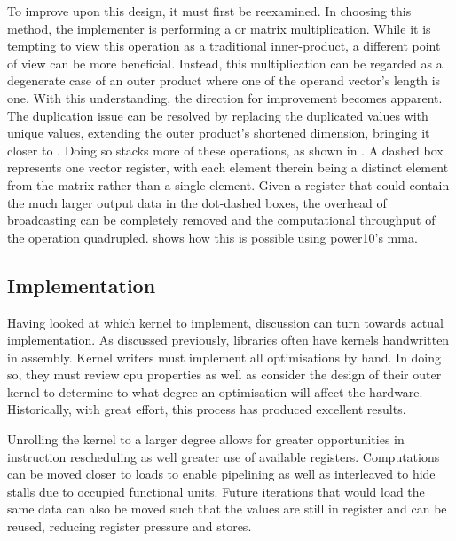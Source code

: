 \documentclass[\main/thesis.tex]{subfiles}
\begin{document}
To improve upon this design, it must first be reexamined.
In choosing this method, the implementer is performing a  or  matrix multiplication.
While it is tempting to view this operation as a traditional inner-product, a different point of view can be more beneficial.
Instead, this multiplication can be regarded as a degenerate case of an outer product where one of the operand vector's length is one.
With this understanding, the direction for improvement becomes apparent.
The duplication issue can be resolved by replacing the duplicated values with unique values, extending the outer product's shortened dimension, bringing it closer to .
Doing so stacks more of these operations, as shown in .
A dashed box represents one vector register, with each element therein being a distinct element from the matrix rather than a single  element.
Given a register that could contain the much larger output data in the dot-dashed boxes, the overhead of broadcasting can be completely removed and the computational throughput of the operation quadrupled.
 shows how this is possible using \gls{power10}'s \gls{mma}.

\subsection{Implementation}
Having looked at which kernel to implement, discussion can turn towards actual implementation.
As discussed previously, libraries often have kernels handwritten in assembly.
Kernel writers must implement all optimisations by hand.
In doing so, they must review \gls{cpu} properties as well as consider the design of their outer kernel to determine to what degree an optimisation will affect the hardware.
Historically, with great effort, this process has produced excellent results.

Unrolling the kernel to a larger degree allows for greater opportunities in instruction rescheduling as well greater use of available registers.
Computations can be moved closer to loads to enable pipelining as well as interleaved to hide stalls due to occupied functional units.
Future iterations that would load the same data can also be moved such that the values are still in register and can be reused, reducing register pressure and stores.
\end{document}
